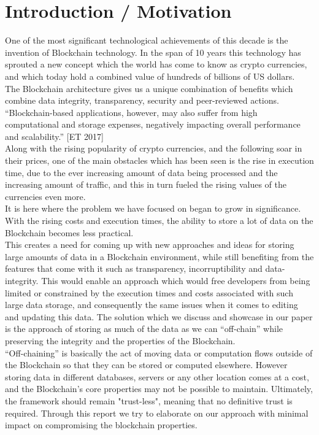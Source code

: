 \section{Introduction / Motivation}

One of the most significant technological achievements of this decade is the invention of Blockchain technology. In the span of 10 years this technology has sprouted a new concept which the world has come to know as crypto currencies, and which today hold a combined value of hundreds of billions of US dollars. \\

The Blockchain architecture gives us a unique combination of benefits which combine data integrity, transparency, security and peer-reviewed actions. 
“Blockchain-based applications, however, may also suffer from high computational and storage expenses, negatively impacting overall performance and scalability.” [ET 2017]\\

Along with the rising popularity of crypto currencies, and the following soar in their prices, one of the main obstacles which has been seen is the rise in execution time, due to the ever increasing amount of data being processed and the increasing amount of traffic, and this in turn fueled the rising values of the currencies even more.  \\

It is here where the problem we have focused on began to grow in significance. With the rising costs and execution times, the ability to store a lot of data on the Blockchain becomes less practical. \\

This creates a need for coming up with new approaches and ideas for storing large amounts of data in a Blockchain environment, while still benefiting from the features that come with it such as transparency, incorruptibility and data-integrity. This would enable an approach which would free developers from being limited or constrained by the execution times and costs associated with such large data storage, and consequently the same issues when it comes to editing and updating this data. The solution which we discuss and showcase in our paper is the approach of storing as much of the data as we can “off-chain” while preserving the integrity and the properties of the Blockchain.\\

“Off-chaining” is basically the act of moving data or computation flows outside of the Blockchain so that they can be stored or computed elsewhere. However storing data in different databases, servers or any other location comes at a cost, and the Blockchain’s core properties may not be possible to maintain. Ultimately, the framework should remain "trust-less", meaning that no definitive trust is required. Through this report we try to elaborate on our approach with minimal impact on compromising the blockchain properties.\\

